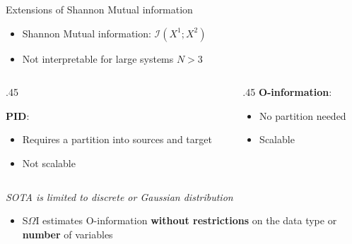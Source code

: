 \begin{frame}{Extensions of Shannon Mutual information}

\begin{itemize}
    \item Shannon Mutual information: 
$\mathcal{I}(X^1; X^2)$%
\item  Not interpretable for large systems $N>3$
\end{itemize}



\begin{columns}
\begin{column}{.45\textwidth}

\textbf{PID}\cite{williams2010nonnegative}:
\begin{itemize}
    \item Requires a partition into sources and target
    \item Not scalable
\end{itemize}
\end{column}
\begin{column}{.45\textwidth}
\textbf{O-information}\cite{Rosas2019QuantifyingHI}:
\begin{itemize}
    \item No partition needed
    \item Scalable
\end{itemize}


\end{column}
\end{columns}

\vspace{0.5cm}

\begin{center}
\textit{SOTA is limited to  discrete or Gaussian distribution}
\end{center}

\begin{itemize}
    \item S$\Omega$I estimates O-information \textbf{without restrictions} on the data type or \textbf{number} of variables
\end{itemize}

\end{frame}



